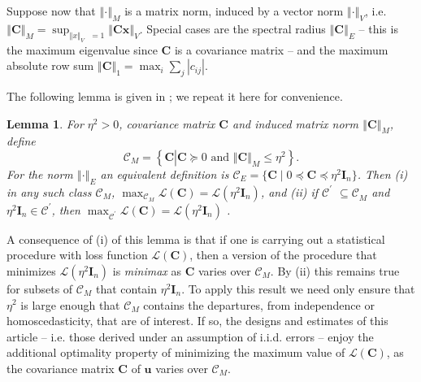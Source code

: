 \documentclass[times, authoryear, 12pt, twoside]{elsarticle}
\newtheorem{lemma}{Lemma}
\begin{document}
Suppose now that $\left\Vert \cdot \right\Vert _{M}$ is a matrix norm,
induced by a vector norm $\left\Vert \cdot \right\Vert _{V}$, i.e. $%
\left\Vert \boldsymbol{C}\right\Vert _{M}=\sup_{\left\Vert x\right\Vert _{V}%
\text{ }=1}\left\Vert \boldsymbol{Cx}\right\Vert _{V}.$ Special cases are
the spectral radius $\left\Vert \boldsymbol{C}\right\Vert _{E}$ -- this is
the maximum eigenvalue since $\boldsymbol{C}$ is a covariance matrix -- and
the maximum absolute row sum $\left\Vert \boldsymbol{C}\right\Vert
_{1}=\max_{i}\sum_{j}\left\vert c_{ij}\right\vert $.

The following lemma is given in \cite{w25}; we repeat it here for
convenience.

\begin{lemma}
\label{lemma: dependence}For $\eta ^{2}>0$, covariance matrix $\boldsymbol{C}
$ and induced matrix norm $\left\Vert \boldsymbol{C}\right\Vert _{M}$, define 
\begin{equation*}
\mathcal{C}_{M}=\left\{ \boldsymbol{C}\left\vert {}\right. \boldsymbol{C}%
\succeq 0\text{ and }\left\Vert \boldsymbol{C}\right\Vert _{M}\leq \eta
^{2}\right\} .
\end{equation*}%
For the norm $\left\Vert \mathbf{\cdot }\right\Vert _{E}$ an equivalent
definition is $\mathcal{C}_{E}=\{\boldsymbol{C}\mid 0\preceq \boldsymbol{C}%
\preceq \eta ^{2}\boldsymbol{I}_{n}\}$. Then \noindent (i) in any such class 
$\mathcal{C}_{M}$, $\max_{\mathcal{C}_{M}}\mathcal{L}\left( \boldsymbol{C}%
\right) =\mathcal{L}\left( \eta ^{2}\boldsymbol{I}_{n}\right) $, and \noindent (ii) if $%
\mathcal{C}^{\prime }$ $\mathcal{\subseteq C}_{M}$ and $\eta ^{2}\boldsymbol{I}_{n}\in 
\mathcal{C}^{\prime }$, then $\max_{\mathcal{C}^{\prime }}\mathcal{L}\left( 
\boldsymbol{C}\right) =\mathcal{L}\left( \eta ^{2}\boldsymbol{I}_{n}\right) $%
.
\end{lemma}

A consequence of (i) of this lemma is that if one is carrying out a
statistical procedure with loss function $\mathcal{L}\left( \boldsymbol{C}%
\right) $, then a version of the procedure that minimizes $\mathcal{L}\left(
\eta ^{2}\boldsymbol{I}_{n}\right) $ is \textit{minimax} as $\boldsymbol{C}$
varies over $\mathcal{C}_{M}$. By (ii) this remains true for subsets of $%
\mathcal{C}_{M}$ that contain $\eta ^{2}\boldsymbol{I}_{n}$. To apply this
result we need only ensure that $\eta ^{2}$ is large enough that $\mathcal{C}%
_{M}$ contains the departures, from independence or homoscedasticity, that
are of interest. If so, the designs and estimates of this article -- i.e.
those derived under an assumption of i.i.d. errors -- enjoy the additional
optimality property of minimizing the maximum value of $\mathcal{L}\left( 
\boldsymbol{C}\right) $, as the covariance matrix $\boldsymbol{C}$ of $%
\boldsymbol{u}$ varies over $\mathcal{C}_{M}$.
\end{document}
